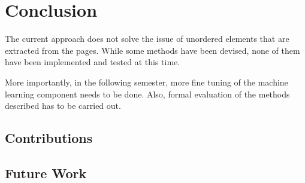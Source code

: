 \chapter{Conclusion}
The current approach does not solve the issue of unordered elements that are extracted from the pages. While some methods have been devised, none of them have been implemented and tested at this time.

More importantly, in the following semester, more fine tuning of the machine learning component needs to be done. Also, formal evaluation of the methods described has to be carried out.

\section{Contributions}
\section{Future Work}